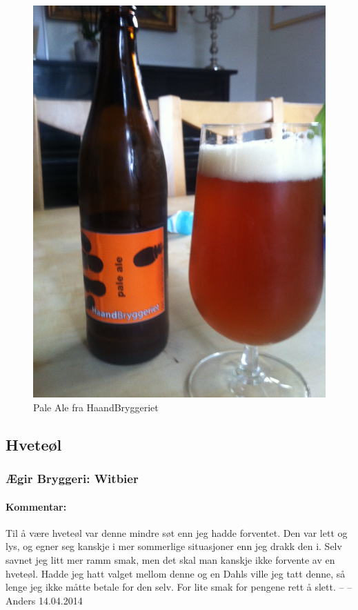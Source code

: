 \documentclass[12pt,a4paper,oneside,norsk]{article}
\begin{document}
\begin{figure} [H]
\centering
\includegraphics[scale=0.1, angle=270]{Bilder/Ol/palealehaand}
\caption{Pale Ale fra HaandBryggeriet}
\end{figure}

\newpage
\subsection{Hveteøl}
\subsubsection{Ægir Bryggeri: Witbier}
\paragraph{Kommentar:} Til å være hveteøl var denne mindre søt enn jeg hadde forventet. Den var lett og lys, og egner seg kanskje i mer sommerlige situasjoner enn jeg drakk den i. Selv savnet jeg litt mer ramm smak, men det skal man kanskje ikke forvente av en hveteøl. Hadde jeg hatt valget mellom denne og en Dahls ville jeg tatt denne, så lenge jeg ikke måtte betale for den selv. For lite smak for pengene rett å slett.
\newline
-- -- Anders 14.04.2014
\end{document}
